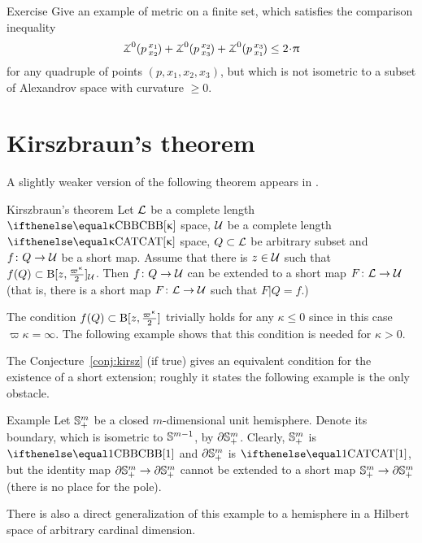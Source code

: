 \begin{thm}{Exercise}
Give an example of metric on a finite set, which satisfies the comparison inequality 
\[\angk{0}{p}{x_1}{x_2}+\angk{0}{p}{x_2}{x_3}+\angk{0}{p}{x_3}{x_1}
\le
2\cdot\pi\]
for any quadruple of points $(p,x_1,x_2,x_3)$, 
but which is not isometric to a subset of Alexandrov space with curvature $\ge0$.
\end{thm}






\section{Kirszbraun's theorem}\label{sec:kirszbraun}

A slightly weaker version of the following theorem
appears in \cite{lang-schroeder}.

\begin{thm}{Kirszbraun's theorem}
\label{thm:kirsz+}
Let
$\mathcal{L}$ be a complete length $\Alex{\kappa}$ space, 
$\mathcal{U}$ be a complete length $\CAT\kappa$ space, 
$Q\subset \spc{L}$ be arbitrary subset
and $f\: Q\to\spc{U}$ be a short map.
Assume that there is $z\in\spc{U}$ such that 
$f(Q)\subset \oBall[z,\tfrac{\varpi\kappa}{2}]_{\spc{U}}$.
Then $f\:Q\to\spc{U}$ can be extended to a short map 
$F\:\spc{L}\to \spc{U}$
(that is, there is a short map $F\:\spc{L}\to \spc{U}$ such that $F|Q=f$.)
\end{thm}
 
The condition $f(Q)\subset \oBall[z,\tfrac{\varpi\kappa}{2}]$ trivially holds for any $\kappa\le 0$ since in this case $\varpi\kappa=\infty$. 
The following example shows that this condition is needed for $\kappa>0$.

The Conjecture~\ref{conj:kirsz} (if true) gives an equivalent condition for the existence of a short extension;
roughly it states the following example is the only obstacle.

\begin{thm}{Example}\label{example:SS_+}
Let $\mathbb{S}^m_+$ be a closed $m$-dimensional unit hemisphere.  Denote its boundary, which is isometric to $\mathbb{S}^{m-1}$, by  $\partial\mathbb{S}^m_+$.
Clearly, $\mathbb{S}^m_+$ is $\Alex{1}$ and $\partial\mathbb{S}^m_+$ is $\CAT1$, but the identity map ${\partial\SS^m_+}\to \partial\SS^m_+$ cannot be extended to a short map $\SS^m_+\to \partial\SS^m_+$ (there is no place for the pole).

There is also a direct generalization of this example to a hemisphere in a Hilbert space of arbitrary cardinal dimension.
\end{thm}

